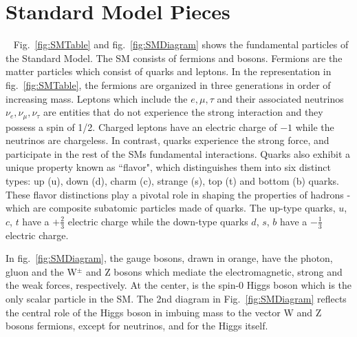 \section{Standard Model Pieces}~\label{sec:SMLagrangian}
Fig.~\ref{fig:SMTable} and fig.~\ref{fig:SMDiagram} shows the fundamental particles of the Standard Model. The SM consists of fermions and bosons. Fermions are the matter particles which consist of quarks and leptons. In the representation in fig.~\ref{fig:SMTable}, the fermions are organized in three generations in order of increasing mass. Leptons which include the $e,\mu, \tau$ and their associated neutrinos $\nu_e, \nu_{\mu}, \nu_{\tau}$ are entities that do not experience the strong interaction and they possess a spin of 1/2. Charged leptons have an electric charge of $-1$ while the neutrinos are chargeless. In contrast, quarks experience the strong force, and participate in the rest of the SMs fundamental interactions. Quarks also exhibit a unique property known as ``flavor", which distinguishes them into six distinct types: up (u), down (d), charm (c), strange (s), top (t) and bottom (b) quarks. These flavor distinctions play a pivotal role in shaping the properties of hadrons - which are composite subatomic particles made of quarks. The up-type quarks, $u$, $c$, $t$ have a $+\frac{2}{3}$ electric charge while the down-type quarks $d$, $s$, $b$ have a $-\frac{1}{3}$ electric charge. 

In fig.~\ref{fig:SMDiagram}, the gauge bosons, drawn in orange, have the photon, gluon and the W$^{\pm}$ and Z bosons which mediate the electromagnetic, strong and the weak forces, respectively. At the center, is the spin-0 Higgs boson which is the only scalar particle in the SM. The 2nd diagram in Fig.~\ref{fig:SMDiagram} reflects the central role of the Higgs boson in imbuing mass to the vector W and Z bosons fermions, except for neutrinos, and for the Higgs itself. 







